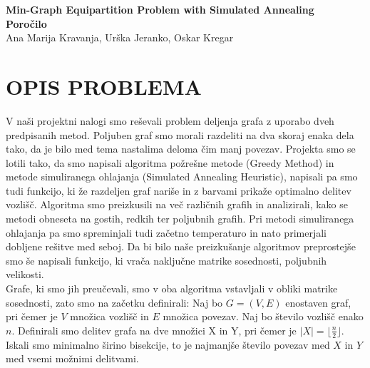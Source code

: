 \documentclass[12pt,a4paper]{amsart}
\theoremstyle{definition} %
\theoremstyle{plain} %
\newcommand{\naslovdela}{Min-Graph Equipartition Problem with Simulated Annealing}
\newcommand{\letnica}{2019}
\begin{document}
\thispagestyle{empty}
\vfill

\begin{center}{\large
{\bf \naslovdela}\\[10mm]
{\bf Poročilo}\\[10mm]
Ana Marija Kravanja, Urška Jeranko, Oskar Kregar}\\[1cm]

\end{center}
\vfill

\noindent{\large
Ljubljana, \letnica}
\pagebreak

\tableofcontents

\pagebreak

\section{\textbf{OPIS PROBLEMA}}
V naši projektni nalogi smo reševali problem deljenja grafa z uporabo dveh predpisanih metod. Poljuben graf smo morali razdeliti na dva skoraj enaka dela tako, da je bilo med tema nastalima deloma čim manj povezav. Projekta smo se lotili tako, da smo napisali algoritma požrešne metode (Greedy Method) in metode simuliranega ohlajanja (Simulated Annealing Heuristic), napisali pa smo tudi funkcijo, ki že razdeljen graf nariše in z barvami prikaže optimalno delitev vozlišč. Algoritma smo preizkusili na več različnih grafih in analizirali, kako se metodi obneseta na gostih, redkih ter poljubnih grafih. Pri metodi simuliranega ohlajanja pa smo spreminjali tudi začetno temperaturo in nato primerjali dobljene rešitve med seboj. Da bi bilo naše preizkušanje algoritmov preprostejše smo še napisali funkcijo, ki vrača naključne matrike sosednosti, poljubnih velikosti. \\

Grafe, ki smo jih preučevali, smo v oba algoritma vstavljali v obliki matrike sosednosti, zato smo na začetku definirali: Naj bo $G=(V,E)$ enostaven graf, pri čemer je $V$ množica vozlišč in $E$ množica povezav. Naj bo število vozlišč enako $n$. Definirali smo delitev grafa na dve množici X in Y, pri čemer je $|X| = \lfloor \frac{n}{2} \rfloor$. Iskali smo minimalno širino bisekcije, to je najmanjše število povezav med $X$ in $Y$ med vsemi možnimi delitvami. \\
\end{document}
